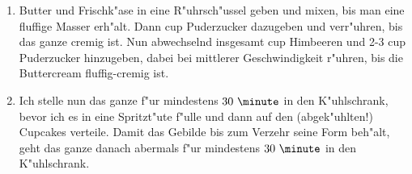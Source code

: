 \begin{enumerate}
\item	Butter und Frischk"ase in eine R"uhrsch"ussel geben und mixen, bis man eine fluffige Masser erh"alt.
      Dann  cup Puderzucker dazugeben und verr"uhren, bis das ganze cremig ist. Nun
      abwechselnd insgesamt  cup Himbeeren und 2-3  cup Puderzucker hinzugeben,
      dabei bei mittlerer Geschwindigkeit r"uhren, bis die Buttercream fluffig-cremig ist.
\item	Ich stelle nun das ganze f"ur mindestens $30~\minute$ in den K"uhlschrank, bevor ich es in eine Spritzt"ute f"ulle
      und dann auf den (abgek"uhlten!) Cupcakes verteile. Damit das Gebilde bis zum Verzehr seine Form beh"alt,
      geht das ganze danach abermals f"ur mindestens $30~\minute$ in den K"uhlschrank.
\end{enumerate}
